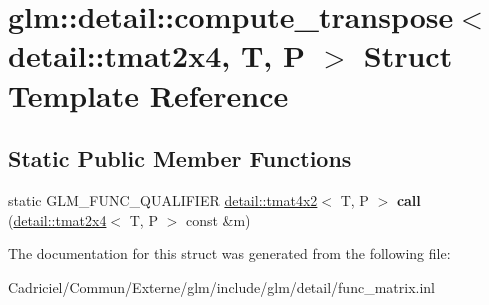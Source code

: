 \hypertarget{structglm_1_1detail_1_1compute__transpose_3_01detail_1_1tmat2x4_00_01_t_00_01_p_01_4}{}\section{glm\+:\+:detail\+:\+:compute\+\_\+transpose$<$ detail\+:\+:tmat2x4, T, P $>$ Struct Template Reference}
\label{structglm_1_1detail_1_1compute__transpose_3_01detail_1_1tmat2x4_00_01_t_00_01_p_01_4}
\subsection*{Static Public Member Functions}
\begin{DoxyCompactItemize}
\item 
static G\+L\+M\+\_\+\+F\+U\+N\+C\+\_\+\+Q\+U\+A\+L\+I\+F\+I\+ER \hyperlink{structglm_1_1detail_1_1tmat4x2}{detail\+::tmat4x2}$<$ T, P $>$ {\bfseries call} (\hyperlink{structglm_1_1detail_1_1tmat2x4}{detail\+::tmat2x4}$<$ T, P $>$ const \&m)\hypertarget{structglm_1_1detail_1_1compute__transpose_3_01detail_1_1tmat2x4_00_01_t_00_01_p_01_4_a773fe20856af1171dcc8d60246eea5d2}{}\label{structglm_1_1detail_1_1compute__transpose_3_01detail_1_1tmat2x4_00_01_t_00_01_p_01_4_a773fe20856af1171dcc8d60246eea5d2}

\end{DoxyCompactItemize}


The documentation for this struct was generated from the following file\+:\begin{DoxyCompactItemize}
\item 
Cadriciel/\+Commun/\+Externe/glm/include/glm/detail/func\+\_\+matrix.\+inl\end{DoxyCompactItemize}
